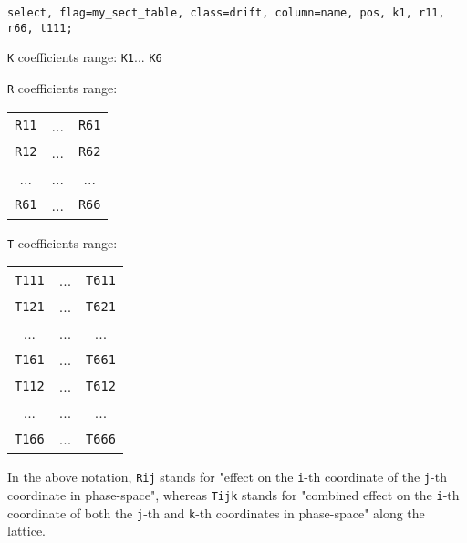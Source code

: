 \begin{verbatim}
select, flag=my_sect_table, class=drift, column=name, pos, k1, r11, r66, t111;
\end{verbatim}



\texttt{K} coefficients range: 
\texttt{K1}... 
\texttt{K6}


\texttt{R} coefficients range: 
\\
\begin{tabular}{ccc}
\texttt{R11} & ... & \texttt{R61} \\ 
\texttt{R12} & ... & \texttt{R62} \\ 
... & ... & ... \\ 
\texttt{R61} & ... & \texttt{R66}
\end{tabular}


\texttt{T} coefficients range: 
\\
\begin{tabular}{ccc}
\texttt{T111} & ... &\texttt{T611} \\ 
\texttt{T121} & ... & \texttt{T621} \\ 
... & ... & ... \\ 
\texttt{T161} & ... & \texttt{T661} \\ 
\texttt{T112} & ... & \texttt{T612} \\ 
... & ... & ... \\ 
\texttt{T166} & ... & \texttt{T666}
\end{tabular}

 In the above notation, 
\texttt{Rij} stands for "effect on the 
\texttt{i}-th coordinate of the 
\texttt{j}-th coordinate in phase-space", whereas 
\texttt{Tijk} stands for "combined effect on the 
\texttt{i}-th coordinate of both the 
\texttt{j}-th and 
\texttt{k}-th coordinates in phase-space" along the lattice. 

% 
% 
% 
% 
% 
% 
% 
   
